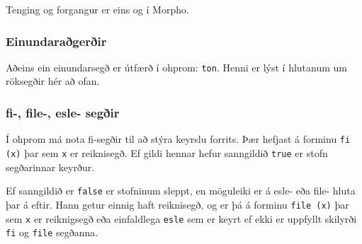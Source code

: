 \documentclass[12pt,a4paper]{article}
\begin{document}
Tenging og forgangur er eins og í Morpho.

\subsubsection{Einundaraðgerðir}
Aðeins ein einundarsegð er útfærð í ohprom: {\tt ton}. Henni er lýst í hlutanum um röksegðir hér að ofan.

\subsubsection{fi-, file-, esle- segðir}
Í ohprom má nota fi-segðir til að stýra keyrslu forrits. Þær hefjast á forminu {\tt fi (x)} þar sem {\tt x} er reiknisegð. Ef gildi hennar hefur sanngildið {\tt true} er stofn
segðarinnar keyrður.

Ef sanngildið er {\tt false} er stofninum sleppt, en möguleiki er á esle- eða file- hluta þar á eftir. Hann getur einnig haft reiknisegð, og er þá á forminu {\tt file (x)} þar sem {\tt x} er reiknigsegð eða einfaldlega {\tt esle} sem er keyrt ef ekki er uppfyllt skilyrði {\tt fi} og {\tt file} segðanna.
\end{document}
